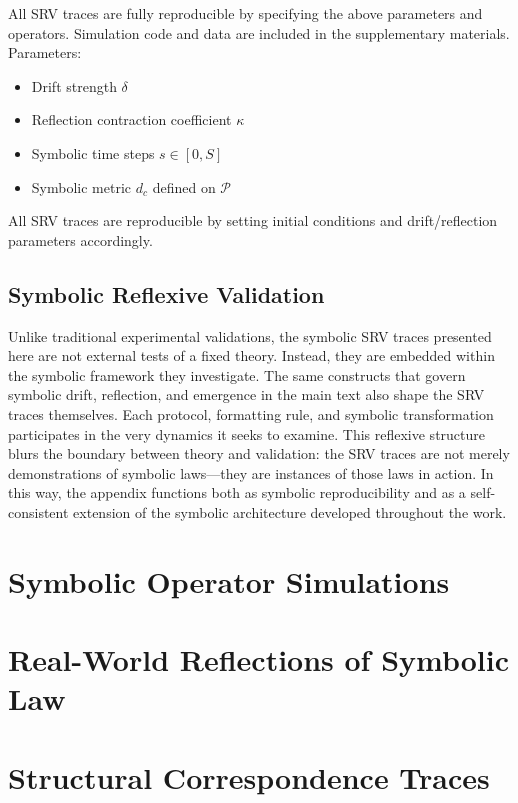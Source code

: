 All SRV traces are fully reproducible by specifying the above parameters and operators. Simulation code and data are included in the supplementary materials.
Parameters:
\begin{itemize}
    \item Drift strength \( \delta \)
    \item Reflection contraction coefficient \( \kappa \)
    \item Symbolic time steps \( s \in [0, S] \)
    \item Symbolic metric \( d_c \) defined on \( \mathcal{P} \)
\end{itemize}
All SRV traces are reproducible by setting initial conditions and drift/reflection parameters accordingly.
\subsection*{Symbolic Reflexive Validation}
\label{subsec:appB_symbolic_reflexive_validation}
Unlike traditional experimental validations, the symbolic SRV traces presented here are not external tests of a fixed theory. Instead, they are embedded within the symbolic framework they investigate.
The same constructs that govern symbolic drift, reflection, and emergence in the main text also shape the SRV traces themselves. Each protocol, formatting rule, and symbolic transformation participates in the very dynamics it seeks to examine.
This reflexive structure blurs the boundary between theory and validation: the SRV traces are not merely demonstrations of symbolic laws---they are instances of those laws in action. In this way, the appendix functions both as symbolic reproducibility and as a self-consistent extension of the symbolic architecture developed throughout the work.
\section*{Symbolic Operator Simulations}
\label{sec:appB_symbolic_operator_simulations}





\section*{Real-World Reflections of Symbolic Law} \label{sec:appB_real_world_reflections}


\section*{Structural Correspondence Traces} \label{sec:appB_structural_correspondence}


\clearpage
{}
